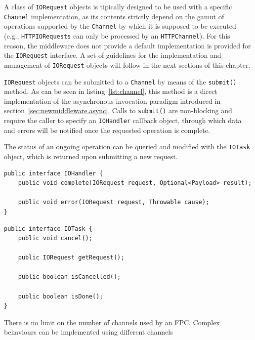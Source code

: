  A class of \texttt{IORequest} objects is tipically designed to be used with a specific \texttt{Channel} implementation, as its contents strictly depend on the gamut of operations supported by the \texttt{Channel} by which it is supposed to be executed (e.g., \texttt{HTTPIORequests} can only be processed by an \texttt{HTTPChannel}). For this reason, the middleware does not provide a default implementation is provided for the \texttt{IORequest} interface. A set of guidelines for the implementation and management of \texttt{IORequest} objects will follow in the next sections of this chapter.

\texttt{IORequest} objects can be submitted to a \texttt{Channel} by means of the \texttt{submit()} method. As can be seen in listing~\ref{lst:channel}, this method is a direct implementation of the asynchronous invocation paradigm introduced in section~\ref{sec:newmiddleware.async}. Calls to \texttt{submit()} are non-blocking and require the caller to specify an \texttt{IOHandler} callback object, through which data and errors will be notified once the requested operation is complete.

The status of an ongoing operation can be queried and modified with the \texttt{IOTask} object, which is returned upon submitting a new request.


\lstset{language=Java}
\begin{lstlisting}[float,floatplacement=H,caption=The IOHandler interface,label={lst:iohandler}]
public interface IOHandler {
	public void complete(IORequest request, Optional<Payload> result);
	
	public void error(IORequest request, Throwable cause);
}
\end{lstlisting}

\lstset{language=Java}
\begin{lstlisting}[float,floatplacement=H,caption=The IOTask interface,label={lst:iotask}]
public interface IOTask {
	public void cancel();
	
	public IORequest getRequest();
	
	public boolean isCancelled();
	
	public boolean isDone();
}
\end{lstlisting}







There is no limit on the number of channels used by an FPC. Complex behaviours can be implemented using different channels

